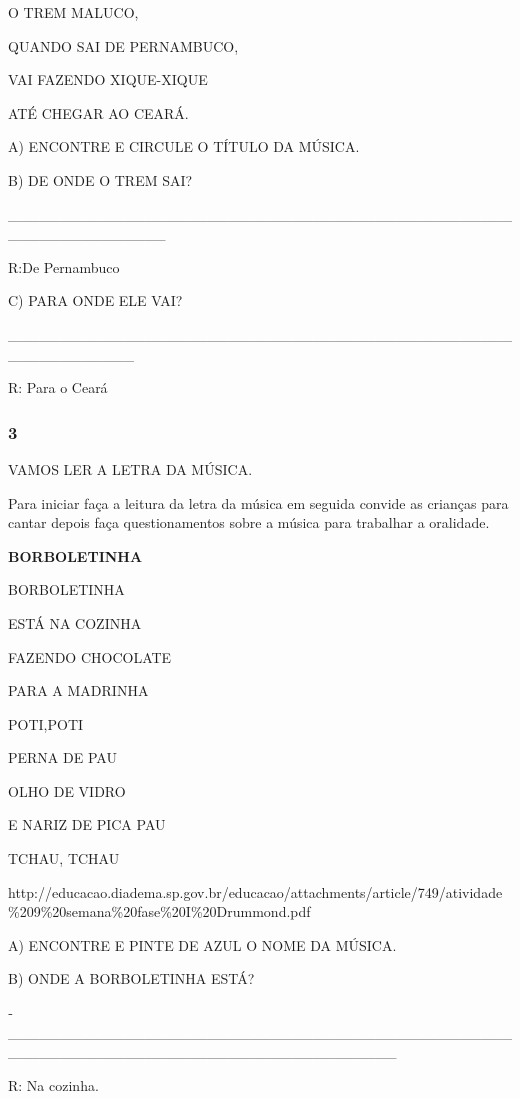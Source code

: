 O TREM MALUCO,

QUANDO SAI DE PERNAMBUCO,

VAI FAZENDO XIQUE-XIQUE

ATÉ CHEGAR AO CEARÁ.

A) ENCONTRE E CIRCULE O TÍTULO DA MÚSICA.

B) DE ONDE O TREM SAI?

\_\_\_\_\_\_\_\_\_\_\_\_\_\_\_\_\_\_\_\_\_\_\_\_\_\_\_\_\_\_\_\_\_\_\_\_\_\_\_\_\_\_\_\_\_\_\_\_\_\_\_\_\_\_\_\_\_\_\_\_\_\_\_

R:De Pernambuco

C) PARA ONDE ELE VAI?

\_\_\_\_\_\_\_\_\_\_\_\_\_\_\_\_\_\_\_\_\_\_\_\_\_\_\_\_\_\_\_\_\_\_\_\_\_\_\_\_\_\_\_\_\_\_\_\_\_\_\_\_\_\_\_\_\_\_\_\_

R: Para o Ceará

\subsubsection{3 }\label{section-31}

VAMOS LER A LETRA DA MÚSICA.

Para iniciar faça a leitura da letra da música em seguida convide as
crianças para cantar depois faça questionamentos sobre a música para
trabalhar a oralidade.

\textbf{BORBOLETINHA}

BORBOLETINHA

ESTÁ NA COZINHA

FAZENDO CHOCOLATE

PARA A MADRINHA

POTI,POTI

PERNA DE PAU

OLHO DE VIDRO

E NARIZ DE PICA PAU

TCHAU, TCHAU

\protect\hypertarget{_Hlk128661930}{}{}http://educacao.diadema.sp.gov.br/educacao/attachments/article/749/atividade\%209\%20semana\%20fase\%20I\%20Drummond.pdf

A) ENCONTRE E PINTE DE AZUL O NOME DA MÚSICA.

B) ONDE A BORBOLETINHA ESTÁ?

­­­­­­­­­­­­­­­­­­­­­­­­­­­\_\_\_\_\_\_\_\_\_\_\_\_\_\_\_\_\_\_\_\_\_\_\_\_\_\_\_\_\_\_\_\_\_\_\_\_\_\_\_\_\_\_\_\_\_\_\_\_\_\_\_\_\_\_\_\_\_\_\_\_\_\_\_\_\_\_\_\_\_\_\_\_\_\_\_\_\_\_\_\_\_\_\_\_\_

R: Na cozinha.


